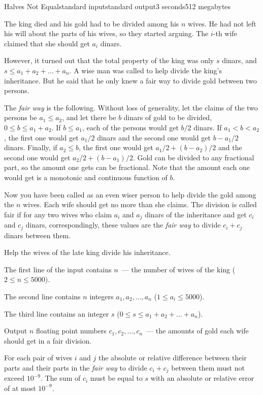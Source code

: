 \begin{problem}{Halves Not Equal}{standard input}{standard output}{3 seconds}{512 megabytes}

The king died and his gold had to be divided among his $n$ wives. He had not left his will about the parts of his wives, so they started arguing. The $i$-th wife claimed that she should get $a_i$ dinars.

However, it turned out that the total property of the king was only $s$ dinars, and $s \le a_1 + a_2 + \ldots + a_n$. A wise man was called to help divide the king's inheritance. But he said that he only knew a fair way to divide gold between two persons.

The \textit{fair way} is the following. Without loss of generality, let the claims of the two persons be $a_1 \le a_2$, and let there be $b$ dinars of gold to be divided, $0 \le b \le a_1 + a_2$. If $b \le a_1$, each of the persons would get $b/2$ dinars. If $a_1 < b < a_2$, the first one would get $a_1/2$ dinars and the second one would get $b - a_1/2$ dinars. Finally, if $a_2 \le b$, the first one would get $a_1/2 + (b - a_2) / 2$ and the second one would get $a_2/2 + (b - a_1) / 2$. Gold can be divided to any fractional part, so the amount one gets can be fractional. Note that the amount each one would get is a monotonic and continuous function of $b$.

Now you have been called as an even wiser person to help divide the gold among the $n$ wives.
Each wife should get no more than she claims. The division is called fair if for any two wives who claim $a_i$ and $a_j$ dinars of the inheritance and get $c_i$ and $c_j$ dinars, correspondingly, these values are the \textit{fair way} to divide $c_i + c_j$ dinars between them.

Help the wives of the late king divide his inheritance.

\InputFile
The first line of the input contains $n$~--- the number of wives of the king ($2 \le n \le 5000$).

The second line contains $n$ integers $a_1, a_2, \ldots, a_n$ ($1 \le a_i \le 5000$).

The third line contains an integer $s$ ($0 \le s \le a_1 + a_2 + \ldots + a_n$).

\OutputFile
Output $n$ floating point numbers $c_1, c_2, \ldots, c_n$~--- the amounts of gold each wife should get in a fair division.

For each pair of wives $i$ and $j$ the absolute or relative difference between their parts and their parts in the \textit{fair way} to divide $c_i + c_j$ between them must not exceed $10^{-9}$. The sum of $c_i$ must be equal to $s$ with an absolute or relative error of at most $10^{-9}$.


\end{problem}
